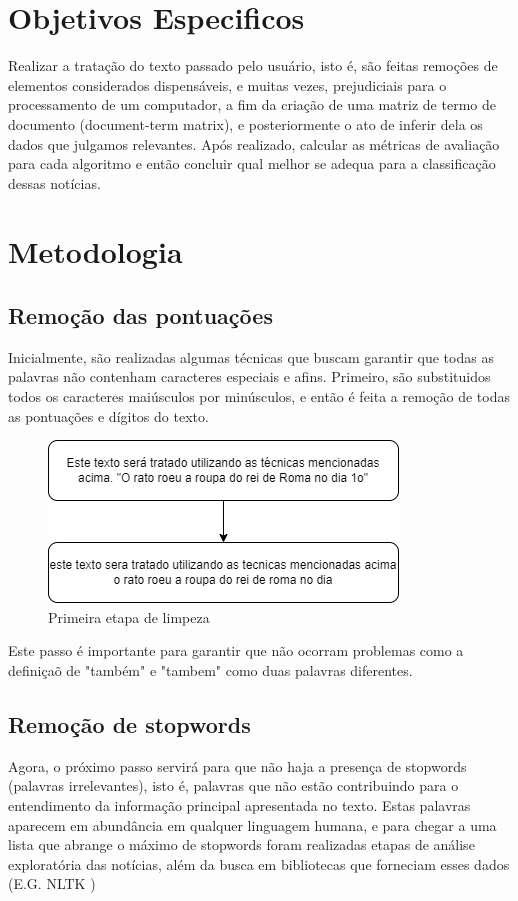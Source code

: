 \documentclass[conference]{IEEEtran}
\begin{document}
\section{Objetivos Especificos}
Realizar a tratação do texto passado pelo usuário, isto é, são feitas remoções de elementos considerados dispensáveis, e muitas vezes, prejudiciais para o processamento de um computador, a fim da criação de uma matriz de termo de documento (document-term matrix), e posteriormente o ato de inferir dela os dados que julgamos relevantes. Após realizado, calcular as métricas de avaliação para cada algoritmo e então concluir qual melhor se adequa para a classificação dessas notícias.

\section{Metodologia}
\subsection{Remoção das pontuações}\label{AA}
Inicialmente, são realizadas algumas técnicas que buscam garantir que todas as palavras não contenham caracteres especiais e afins. Primeiro, são substituidos todos os caracteres maiúsculos por minúsculos, e então é feita a remoção de todas as pontuações e dígitos do texto.

\begin{figure}[htbp]
\centerline{\includegraphics[scale=0.5]{figura1.png}}
\caption{Primeira etapa de limpeza}
\label{fig}
\end{figure}

Este passo é importante para garantir que não ocorram problemas como a definiçaõ de "também" e "tambem" como duas palavras diferentes.


\subsection{Remoção de stopwords}
Agora, o próximo passo servirá para que não haja a presença de stopwords (palavras irrelevantes), isto é, palavras que não estão contribuindo para o entendimento da informação principal apresentada no texto. Estas palavras aparecem em abundância em qualquer linguagem humana, e para chegar a uma lista que abrange o máximo de stopwords foram realizadas etapas de análise exploratória das notícias, além da busca em bibliotecas que forneciam esses dados (E.G. NLTK \cite{b6})
\end{document}
